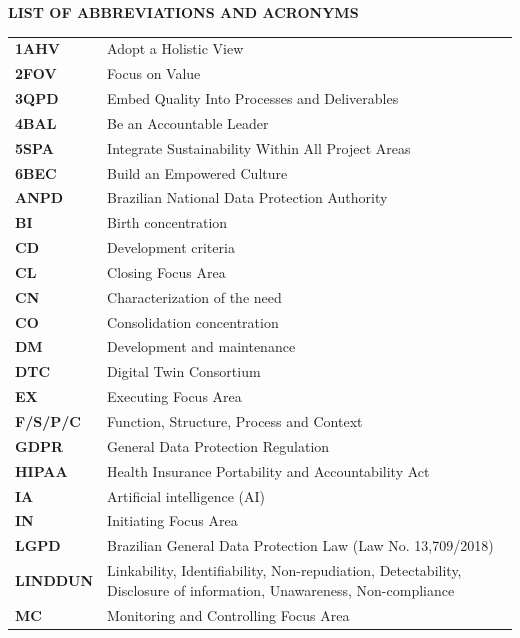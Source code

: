 \documentclass[12pt,a4paper,article,oneside,brazil,english]{abntex2}
\begin{document}
\begingroup
\SingleSpacing
\begin{center}\textbf{LIST OF ABBREVIATIONS AND ACRONYMS}\end{center}
\small
\begin{longtable}{@{}>{\raggedright\arraybackslash}p{2.6cm}>{\raggedright\arraybackslash}p{\dimexpr\linewidth-2.6cm-2\tabcolsep\relax}@{}}
\textbf{1AHV} & Adopt a Holistic View\\[2pt]
\textbf{2FOV} & Focus on Value\\[2pt]
\textbf{3QPD} & Embed Quality Into Processes and Deliverables\\[2pt]
\textbf{4BAL} & Be an Accountable Leader\\[2pt]
\textbf{5SPA} & Integrate Sustainability Within All Project Areas\\[2pt]
\textbf{6BEC} & Build an Empowered Culture\\[2pt]
\textbf{ANPD} & Brazilian National Data Protection Authority\\[2pt]
\textbf{BI} & Birth concentration\\[2pt]
\textbf{CD} & Development criteria\\[2pt]
\textbf{CL} & Closing Focus Area\\[2pt]
\textbf{CN} & Characterization of the need\\[2pt]
\textbf{CO} & Consolidation concentration\\[2pt]
\textbf{DM} & Development and maintenance\\[2pt]
\textbf{DTC} & Digital Twin Consortium\\[2pt]
\textbf{EX} & Executing Focus Area\\[2pt]
\textbf{F/S/P/C} & Function, Structure, Process and Context\\[2pt]
\textbf{GDPR} & General Data Protection Regulation\\[2pt]
\textbf{HIPAA} & Health Insurance Portability and Accountability Act\\[2pt]
\textbf{IA} & Artificial intelligence (AI)\\[2pt]
\textbf{IN} & Initiating Focus Area\\[2pt]
\textbf{LGPD} & Brazilian General Data Protection Law (Law No. 13,709/2018)\\[2pt]
\textbf{LINDDUN} & Linkability, Identifiability, Non-repudiation, Detectability, Disclosure of information, Unawareness, Non-compliance\\[2pt]
\textbf{MC} & Monitoring and Controlling Focus Area\\[2pt]

\end{longtable}
\end{document}
